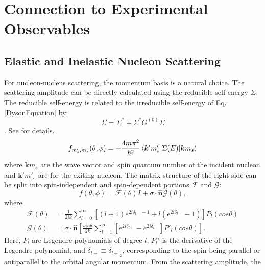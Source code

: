\section{Connection to Experimental Observables}

\subsection{Elastic and Inelastic Nucleon Scattering} \label{ConnectionToScattering}
For nucleon-nucleus scattering, the momentum basis is a natural choice. The scattering amplitude can be directly calculated using the
reducible self-energy $\Sigma$\footnotemark:
\footnotetext
{
    The reducible self-energy is related to the irreducible
    self-energy of Eq. \ref{DysonEquation} by:
    \begin{equation}
        \Sigma = \Sigma^{*} + \Sigma^{*}G^{(0)}\Sigma
    \end{equation}. See \cite{MahzoonPhDThesis} for details.
}
\begin{equation}
    f_{m'_{s},m_{s}}(\theta,\phi) =
    -\frac{4m\pi^{2}}{\hbar^{2}}\braket{\bm{k}'m'_{s}|\Sigma(E)|\bm{k}m_{s}}
\end{equation}
where $\bm{k}m_{s}$ are the wave vector and spin quantum number of the incident nucleon and
$\bm{k'}m'_{s}$ are for the exiting nucleon. The matrix structure of the right side can be
split into spin-independent and spin-dependent portions $\mathcal{F}$ and $\mathcal{G}$:
\begin{equation}
    f(\theta,\phi) = \mathcal{F}(\theta)I +
    \sigma\cdot\bm{\hat{n}}\mathcal{G}(\theta),
\end{equation}
where
\begin{equation}
    \begin{split}
        \mathcal{F}(\theta) & = \frac{1}{2ik}\sum_{l=0}^{\infty}\left[(l+1)e^{2i\delta_{l+} - 1} +
        l\left(e^{2i\delta_{l-}}-1\right)\right]P_{l}(cos\theta)\\
        \mathcal{G}(\theta) & =
        \sigma\cdot\bm{\hat{n}}\left[\frac{sin\theta}{2k}\sum_{l=1}^{\infty}[e^{2i\delta_{l+}}-e^{2i\delta_{l-}}]P'_{l}(cos\theta)\right].
    \end{split}
\end{equation}
Here, $P_{l}$ are Legendre polynomials of degree $l$, $P_{l}'$ is the derivative of the Legendre
polynomial, and $\delta_{l\pm} \equiv \delta_{l\pm\frac{1}{2}}$, corresponding to the spin being
parallel or antiparallel to the orbital angular momentum. From the scattering amplitude, the 
